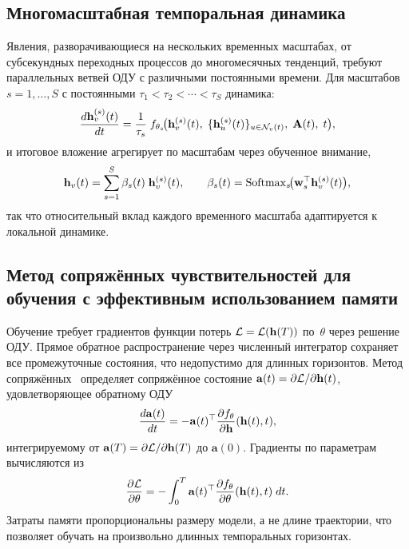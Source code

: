 \subsection{Многомасштабная темпоральная динамика}

Явления, разворачивающиеся на нескольких временных масштабах, от субсекундных переходных процессов до многомесячных тенденций, требуют параллельных ветвей ОДУ с различными постоянными времени. Для масштабов $s=1,\dots,S$ с постоянными $\tau_1<\tau_2<\cdots<\tau_S$ динамика:
\begin{equation}
\frac{d\mathbf{h}_v^{(s)}(t)}{dt}
= \frac{1}{\tau_s}\;f_{\theta_s}\!\bigl(
  \mathbf{h}_v^{(s)}(t),\;\{\mathbf{h}_u^{(s)}(t)\}_{u\in\mathcal{N}_v(t)},\;
  \mathbf{A}(t),\;t\bigr),
\label{eq:ct_tgnn_multi}
\end{equation}
и итоговое вложение агрегирует по масштабам через обученное внимание,
\begin{equation}
\mathbf{h}_v(t)
= \sum_{s=1}^{S}\beta_s(t)\;\mathbf{h}_v^{(s)}(t),
\qquad
\beta_s(t) = \mathrm{Softmax}_s\!\bigl(\mathbf{w}_s^\top\mathbf{h}_v^{(s)}(t)\bigr),
\label{eq:ct_tgnn_scale_fuse}
\end{equation}
так что относительный вклад каждого временного масштаба адаптируется к локальной динамике.

\subsection{Метод сопряжённых чувствительностей для обучения с эффективным использованием памяти}

Обучение требует градиентов функции потерь $\mathcal{L}=\mathcal{L}(\mathbf{h}(T))$ по~$\theta$ через решение ОДУ. Прямое обратное распространение через численный интегратор сохраняет все промежуточные состояния, что недопустимо для длинных горизонтов. Метод сопряжённых~\cite{Pontryagin1962,Chen2018} определяет сопряжённое состояние $\mathbf{a}(t)=\partial\mathcal{L}/\partial\mathbf{h}(t)$, удовлетворяющее обратному ОДУ
\begin{equation}
\frac{d\mathbf{a}(t)}{dt}
= -\mathbf{a}(t)^\top\frac{\partial f_\theta}{\partial\mathbf{h}}(\mathbf{h}(t),t),
\label{eq:adjoint_ode}
\end{equation}
интегрируемому от $\mathbf{a}(T)=\partial\mathcal{L}/\partial\mathbf{h}(T)$ до $\mathbf{a}(0)$. Градиенты по параметрам вычисляются из
\begin{equation}
\frac{\partial\mathcal{L}}{\partial\theta}
= -\int_0^T \mathbf{a}(t)^\top
  \frac{\partial f_\theta}{\partial\theta}(\mathbf{h}(t),t)\;dt.
\label{eq:adjoint_param}
\end{equation}
Затраты памяти пропорциональны размеру модели, а не длине траектории, что позволяет обучать на произвольно длинных темпоральных горизонтах.

